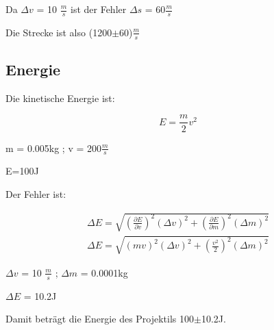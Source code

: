 \documentclass{scrartcl}
\begin{document}
Da $\Delta v$ = 10 $\frac{m}{s}$ ist der Fehler $\Delta s$ = 60$\frac{m}{s}$

Die Strecke ist also (1200$\pm$60)$\frac{m}{s}$

\subsection{Energie}

Die kinetische Energie ist:

\begin{displaymath}
    E=\frac{m}{2} v^2
\end{displaymath}

m = 0.005kg ;  v = 200$\frac{m}{s}$

E=100J

Der Fehler ist:

\begin{align}
    \Delta E = \sqrt{\left(\frac{\partial E}{\partial v}\right)^2 (\Delta v )^2 + \left(\frac{\partial E}{\partial m}\right)^2 (\Delta m)^2}  \nonumber \\
    \Delta E = \sqrt{(mv)^2 (\Delta v )^2 + \left(\frac{v^2}{2}\right)^2 (\Delta m)^2} \nonumber
\end{align}

$\Delta v$ = 10 $\frac{m}{s}$ ; $\Delta m$ = 0.0001kg

$\Delta E$ = 10.2J

Damit beträgt die Energie des Projektils 100$\pm$10.2J.
\end{document}
